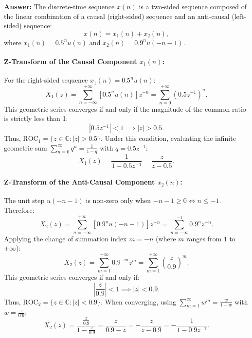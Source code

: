 \documentclass[12pt,a4paper]{article}
\begin{document}
\noindent\textbf{Answer:}
The discrete-time sequence $x(n)$ is a two-sided sequence composed of the linear combination of a causal (right-sided) sequence and an anti-causal (left-sided) sequence:
\begin{equation*}
    x(n) = x_1(n) + x_2(n),
\end{equation*}
where $x_1(n) = 0.5^n u(n)$ and $x_2(n) = 0.9^n u(-n - 1)$.

\paragraph{Z-Transform of the Causal Component $x_1(n)$:}
For the right-sided sequence $x_1(n) = 0.5^n u(n)$:
\begin{equation*}
    X_1(z) = \sum_{n=-\infty}^{+\infty} \left[0.5^n u(n)\right] z^{-n} = \sum_{n=0}^{+\infty} \left(0.5 z^{-1}\right)^n.
\end{equation*}
This geometric series converges if and only if the magnitude of the common ratio is strictly less than 1:
\begin{equation*}
    |0.5 z^{-1}| < 1 \implies |z| > 0.5.
\end{equation*}
Thus, $\text{ROC}_1 = \{z \in \mathbb{C} : |z| > 0.5\}$. Under this condition, evaluating the infinite geometric sum $\sum_{n=0}^{\infty} q^n = \frac{1}{1 - q}$ with $q = 0.5 z^{-1}$:
\begin{equation*}
    X_1(z) = \frac{1}{1 - 0.5 z^{-1}} = \frac{z}{z - 0.5}.
\end{equation*}

\paragraph{Z-Transform of the Anti-Causal Component $x_2(n)$:}
The unit step $u(-n - 1)$ is non-zero only when $-n - 1 \ge 0 \iff n \le -1$. Therefore:
\begin{equation*}
    X_2(z) = \sum_{n=-\infty}^{+\infty} \left[0.9^n u(-n - 1)\right] z^{-n} = \sum_{n=-\infty}^{-1} 0.9^n z^{-n}.
\end{equation*}
Applying the change of summation index $m = -n$ (where $m$ ranges from $1$ to $+\infty$):
\begin{equation*}
    X_2(z) = \sum_{m=1}^{+\infty} 0.9^{-m} z^m = \sum_{m=1}^{+\infty} \left(\frac{z}{0.9}\right)^m.
\end{equation*}
This geometric series converges if and only if:
\begin{equation*}
    \left|\frac{z}{0.9}\right| < 1 \implies |z| < 0.9.
\end{equation*}
Thus, $\text{ROC}_2 = \{z \in \mathbb{C} : |z| < 0.9\}$. When converging, using $\sum_{m=1}^{\infty} w^m = \frac{w}{1 - w}$ with $w = \frac{z}{0.9}$:
\begin{equation*}
    X_2(z) = \frac{\frac{z}{0.9}}{1 - \frac{z}{0.9}} = \frac{z}{0.9 - z} = -\frac{z}{z - 0.9} = -\frac{1}{1 - 0.9 z^{-1}}.
\end{equation*}
\end{document}
